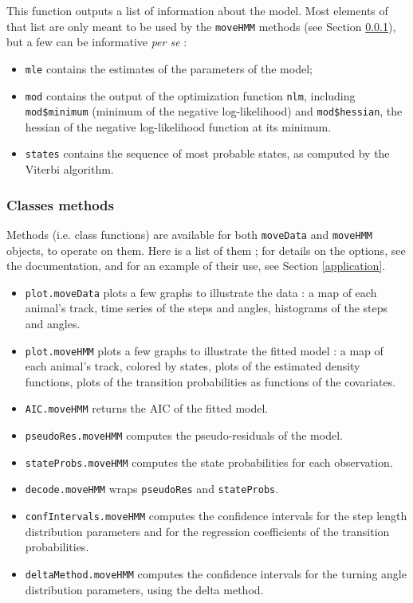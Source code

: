 \documentclass[]{article}
\begin{document}
This function outputs a list of information about the model. Most elements of that list are only meant to be used by the \texttt{moveHMM} methods (see Section \ref{methods}), but a few can be informative \textit{per se} :
\begin{itemize}
	\item \texttt{mle} contains the estimates of the parameters of the model;
	\item \texttt{mod} contains the output of the optimization function \texttt{nlm}, including \texttt{mod\$minimum} (minimum of the negative log-likelihood) and \texttt{mod\$hessian}, the hessian of the negative log-likelihood function at its minimum.
	\item \texttt{states} contains the sequence of most probable states, as computed by the Viterbi algorithm.
\end{itemize}

\subsubsection{Classes methods} \label{methods}
Methods (i.e. class functions) are available for both \texttt{moveData} and \texttt{moveHMM} objects, to operate on them. Here is a list of them ; for details on the options, see the documentation, and for an example of their use, see Section \ref{application}.

\begin{itemize}
	\item \texttt{plot.moveData} plots a few graphs to illustrate the data : a map of each animal's track, time series of the steps and angles, histograms of the steps and angles.
	\item \texttt{plot.moveHMM} plots a few graphs to illustrate the fitted model : a map of each animal's track, colored by states, plots of the estimated density functions, plots of the transition probabilities as functions of the covariates.
	\item \texttt{AIC.moveHMM} returns the AIC of the fitted model.
	\item \texttt{pseudoRes.moveHMM} computes the pseudo-residuals of the model.
	\item \texttt{stateProbs.moveHMM} computes the state probabilities for each observation.
	\item \texttt{decode.moveHMM} wraps \texttt{pseudoRes} and \texttt{stateProbs}.
	\item \texttt{confIntervals.moveHMM} computes the confidence intervals for the step length distribution parameters and for the regression coefficients of the transition probabilities.
	\item \texttt{deltaMethod.moveHMM} computes the confidence intervals for the turning angle distribution parameters, using the delta method.
\end{itemize} 
\end{document}

